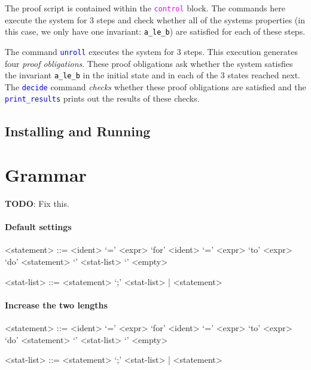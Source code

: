 \documentclass{article}
\newcommand{\uclid}{{\sc{Uclid}}}
\newcommand{\ident}[1]{\textcolor{black}{\texttt{#1}}}
\newcommand{\keywordbf}[1]{\textcolor{magenta}{\texttt{{#1}}}}
\newcommand{\proofcmd}[1]{\textcolor{blue}{\texttt{{#1}}}}
\begin{document}
The proof script is contained within the \keywordbf{control} block. The commands here execute the system for 3 steps and check whether all of the systems properties (in this case, we only have one invariant: \ident{a\_le\_b}) are satisfied for each of these steps. 

The command \proofcmd{unroll} executes the system for 3 steps. This execution generates four \emph{proof obligations}. These proof obligations ask whether the system satisfies the invariant \ident{a\_le\_b} in the initial state and in each of the 3 states reached next. The \proofcmd{decide} command \emph{checks} whether these proof obligations are satisfied and the \proofcmd{print\_results} prints out the results of these checks.

\subsection{Installing and Running \uclid{}}

\section{\uclid{} Grammar}

\textbf{TODO}: Fix this.

\paragraph{Default settings}
\begin{grammar}

<statement> ::= <ident> `=' <expr>
\alt `for' <ident> `=' <expr> `to' <expr> `do' <statement>
\alt `{' <stat-list> `}'
\alt <empty>

<stat-list> ::= <statement> `;' <stat-list> | <statement>

\end{grammar}
\paragraph{Increase the two lengths}
\setlength{\grammarparsep}{20pt plus 1pt minus 1pt} %
\setlength{\grammarindent}{12em} %

\begin{grammar}

<statement> ::= <ident> `=' <expr>
\alt `for' <ident> `=' <expr> `to' <expr> `do' <statement>
\alt `{' <stat-list> `}'
\alt <empty>

<stat-list> ::= <statement> `;' <stat-list> | <statement>

\end{grammar}
\end{document}
